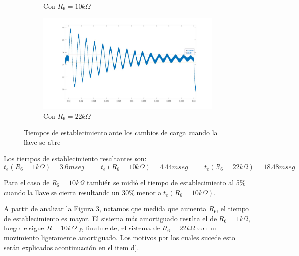 \documentclass[e4_tp2_main.tex]{subfiles}
\begin{document}
\begin{figure}[H]
\begin{subfigure}[b]{0.3\textwidth}
    \caption{ Con $R_6=10k\Omega$}
    \label{fig:f2}
  \end{subfigure}
  \hfill
  \begin{subfigure}[b]{0.3\textwidth}
    \includegraphics[width=\textwidth, height=\textwidth]{Imagenes/Punto1/Test_con_R6_22k.jpeg}
    \caption{ Con $R_6=22k\Omega$}
    \label{fig:f3}
  \end{subfigure}
  \caption{Tiempos de establecimiento ante los cambios de carga cuando la llave se abre}
\end{figure}

Los tiempos de establecimiento resultantes son: 
\hspace{0.1cm}
\begin{equation}
t_e(R_6=1k\Omega)=3.6 mseg
\hspace{1cm}
t_e(R_6=10k\Omega)=4.44 mseg
\hspace{1cm}
t_e(R_6=22k\Omega)=18.48 mseg
\end{equation}

Para el caso de $R_6=10k\Omega$ tambi\'en se midi\'o el tiempo de establecimiento al 5\% cuando la llave se cierra resultando un 30\% menor a $t_e(R_6=10k\Omega)$. 

A partir de analizar la Figura \ref{fig:f3}, notamos que medida que aumenta $R_6$, el tiempo de establecimiento es mayor. El sistema m\'as amortiguado resulta el de $R_6=1k\Omega$, luego le sigue $R=10k\Omega$ y, finalmente, el sistema de $R_6=22k\Omega$ con un movimiento ligeramente amortiguado. Los motivos por los cuales sucede esto ser\'an explicados acontinuaci\'on en el item d).
\end{document}
